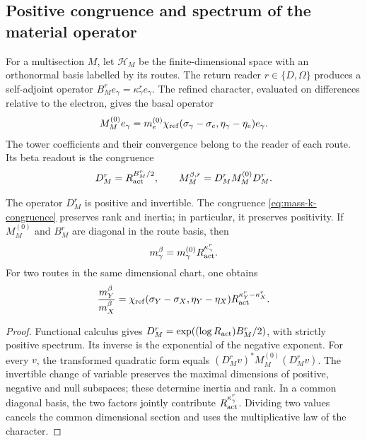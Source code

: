 \subsection{Positive congruence and spectrum of the material operator}

For a multisection \(M\), let \(\mathscr H_M\) be the finite-dimensional space
with an orthonormal basis labelled by its routes. The return reader
\(r\in\{D,\Omega\}\) produces a self-adjoint operator
\(B_M^r e_\gamma=\kappa_\gamma^r e_\gamma\). The refined character,
evaluated on differences relative to the electron, gives the basal operator
\[
 M_M^{(0)}e_\gamma=
 m_e^{(0)}\chi_{\rm ref}(\sigma_\gamma-\sigma_e,
                  \eta_\gamma-\eta_e)e_\gamma.
\]
The tower coefficients and their convergence belong to the reader of each
route. Its beta readout is the congruence
\begin{equation}
 D_M^r=R_{\rm act}^{B_M^r/2},\qquad
 M_M^{\beta,r}=D_M^rM_M^{(0)}D_M^r.
 \label{eq:mass-k-congruence}
\end{equation}

\begin{proposition}
The operator \(D_M^r\) is positive and invertible. The congruence
\eqref{eq:mass-k-congruence} preserves rank and inertia; in particular,
it preserves positivity. If \(M_M^{(0)}\) and \(B_M^r\) are diagonal
in the route basis, then
\[
 m_\gamma^\beta=m_\gamma^{(0)}R_{\rm act}^{\kappa_\gamma^r}.
\]
For two routes in the same dimensional chart, one obtains
\[
 \frac{m_Y^\beta}{m_X^\beta}=
 \chi_{\rm ref}(\sigma_Y-\sigma_X,\eta_Y-\eta_X)
 R_{\rm act}^{\kappa_Y^r-\kappa_X^r}.
\]
\end{proposition}
\begin{proof}
Functional calculus gives
\(D_M^r=\exp((\log R_{\rm act})B_M^r/2)\), with strictly
positive spectrum. Its inverse is the exponential of the negative exponent.
For every \(v\), the transformed quadratic form equals
\((D_M^rv)^*M_M^{(0)}(D_M^rv)\). The invertible change of variable
preserves the maximal dimensions of positive, negative
and null subspaces; these determine inertia and rank. In a common
diagonal basis, the two factors jointly contribute
\(R_{\rm act}^{\kappa_\gamma^r}\). Dividing two values cancels
the common dimensional section and uses the multiplicative law of the
character.
\end{proof}

